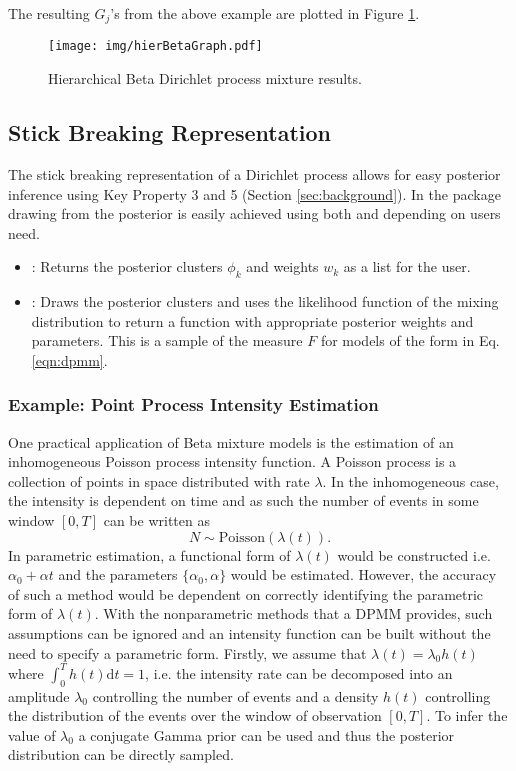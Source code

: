 \documentclass[nojss]{jss}
\begin{document}
The resulting $G_j$'s from the above example are plotted in Figure \ref{fig:hierBeta}.
\begin{figure}
\centering
\texttt{[image: img/hierBetaGraph.pdf]}
\caption{Hierarchical Beta Dirichlet process mixture results.}
\label{fig:hierBeta}
\end{figure}


\subsection{Stick Breaking Representation}
The stick breaking representation of a Dirichlet process allows for easy posterior inference using Key Property 3 and 5 (Section \ref{sec:background}). In the  package drawing from the posterior is easily achieved using both  and  depending on users need.
\begin{itemize}
\item {}: Returns the posterior clusters $\phi _k$ and weights $w_k$ as a list for the user.
\item {}: Draws the posterior clusters and uses the likelihood function of the mixing distribution to return a function with appropriate posterior weights and parameters. This is a sample of the measure $F$ for models of the form in Eq. \eqref{eqn:dpmm}.
\end{itemize}

\subsubsection{Example: Point Process Intensity Estimation}
One practical application of Beta mixture models is the estimation of an inhomogeneous Poisson process intensity function. A Poisson process is a collection of points in space distributed with rate $\lambda$. In the inhomogeneous case, the intensity is dependent on time and as such the number of events in some window $\left[0 , T\right]$ can be written as
\begin{equation}
N \sim \text{Poisson} (\lambda (t) ).
\end{equation}
In parametric estimation, a functional form of $\lambda (t)$ would be constructed i.e. $\alpha _0 + \alpha t$ and the parameters $\{\alpha _0, \alpha \}$ would be estimated. However, the accuracy of such a method would be dependent on correctly identifying the parametric form of $\lambda (t)$. With the nonparametric methods that a DPMM provides, such assumptions can be ignored and an intensity function can be built without the need to specify a parametric form. Firstly, we assume that $\lambda (t) = \lambda _0 h(t)$ where $\int _0 ^T h(t) \mathrm{d} t = 1$, i.e. the intensity rate can be decomposed into an amplitude $\lambda _0$ controlling the number of events and a density $h(t)$ controlling the distribution of the events over the window of observation $\left[0 , T\right]$. To infer the value of $\lambda _0$ a conjugate Gamma prior can be used and thus the posterior distribution can be directly sampled.
\end{document}
